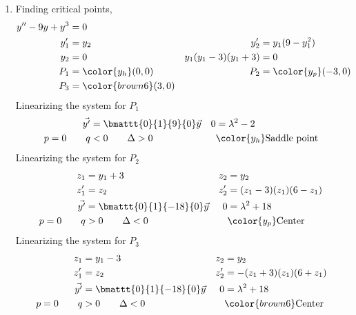 \begin{enumerate}
    \item Finding critical points,
          \begin{align}
              y'' - 9y + y^{3}       & = 0                       \\
              y_1'                   & = y_2                   &
              y_2'                   & = y_1(9 - y_1^{2})        \\
              y_2                    & = 0                     &
              y_1 (y_1 - 3)(y_1 + 3) & = 0                       \\
              P_1                    & = \color{y_h}(0, 0)     &
              P_2                    & = \color{y_p} (-3, 0)     \\
              P_3                    & = \color{brown6} (3, 0)
          \end{align}
          Linearizing the system for $ P_1 $
          \begin{align}
              \vec{y'}       & = \bmattt{0}{1}{9}{0} \vec{y}   &
              0              & = \lambda^{2} - 2                 \\
              p = 0 \qquad q & < 0 \qquad \Delta > 0           &
                             & \color{y_h} \text{Saddle point}
          \end{align}
          Linearizing the system for $ P_2 $
          \begin{align}
              z_1            & = y_1 + 3                       &
              z_2            & = y_2                             \\
              z_1'           & = z_2                           &
              z_2'           & = (z_1 - 3)(z_1)(6 - z_1)         \\
              \vec{y'}       & = \bmattt{0}{1}{-18}{0} \vec{y} &
              0              & = \lambda^{2} + 18                \\
              p = 0 \qquad q & > 0 \qquad \Delta < 0           &
                             & \color{y_p} \text{Center}
          \end{align}
          Linearizing the system for $ P_3 $
          \begin{align}
              z_1            & = y_1 - 3                       &
              z_2            & = y_2                             \\
              z_1'           & = z_2                           &
              z_2'           & = -(z_1 + 3)(z_1)(6 + z_1)        \\
              \vec{y'}       & = \bmattt{0}{1}{-18}{0} \vec{y} &
              0              & = \lambda^{2} + 18                \\
              p = 0 \qquad q & > 0 \qquad \Delta < 0           &
                             & \color{brown6} \text{Center}
          \end{align}


\end{enumerate}
